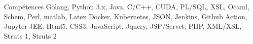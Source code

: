 
\begin{rubric}{Compétences}
%
	Golang, Python $3$.x, Java,  C/C++, CUDA, PL/SQL, XSL, Ocaml, Schem, Perl, matlab, Latex 
%
	Docker, Kubernetes, JSON, Jenkins, Github Action, Jupyter 
%
  	JEE, Html$5$, CSS$3$, JavaScript, Jquery, JSP/Servet, PHP, XML/XSL, Struts $1$, Struts $2$
\end{rubric}
